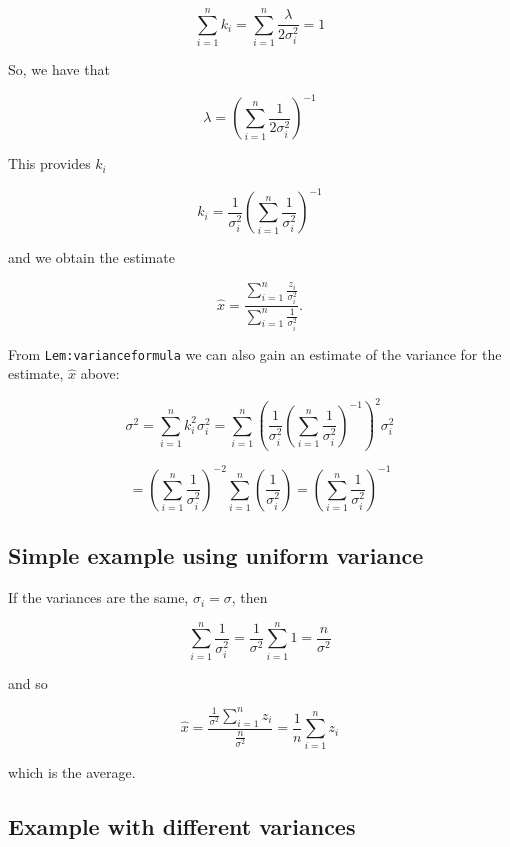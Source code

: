 \[\sum_{i=1}^n k_i =  \sum_{i=1}^n \frac{\lambda}{2\sigma_i^2} = 1\]

So, we have that

\[\lambda =  \left(\displaystyle\sum_{i=1}^n \displaystyle \frac{1}{2\sigma_i^2}\right)^{-1}\]

This provides \(k_i\)

\[k_i = \frac{1}{\sigma_i^2} \left(\displaystyle\sum_{i=1}^n \displaystyle \frac{1}{\sigma_i^2}\right)^{-1}\]

and we obtain the estimate

\[\hat{x} = \displaystyle \frac{\displaystyle \sum_{i=1}^n \frac{z_i}{\sigma_i^2}}
{\displaystyle \sum_{i=1}^n \frac{1}{\sigma_i^2}}.\]

From \texttt{Lem:varianceformula} we can also gain an estimate of the
variance for the estimate, \(\hat{x}\) above:

\[\sigma^2 =  \sum_{i=1}^n k_i^2\sigma_i^2 =  \sum_{i=1}^n\left( \frac{1}{\sigma_i^2} \left(\displaystyle\sum_{i=1}^n \displaystyle \frac{1}{\sigma_i^2}\right)^{-1}\right)^2 \sigma_i^2\]

\[=  \left(\displaystyle\sum_{i=1}^n \displaystyle \frac{1}{\sigma_i^2}\right)^{-2} \sum_{i=1}^n\left( \frac{1}{\sigma_i^2} \right) =  \left(\displaystyle\sum_{i=1}^n \displaystyle \frac{1}{\sigma_i^2}\right)^{-1}\]

\hypertarget{simple-example-using-uniform-variance}{%
\subsection{Simple example using uniform
variance}\label{simple-example-using-uniform-variance}}

If the variances are the same, \(\sigma_i = \sigma\), then

\[\sum_{i=1}^n \frac{1}{\sigma_i^2} = \frac{1}{\sigma^2} \sum_{i=1}^n 1 = \frac{n}{\sigma^2}\]

and so

\[\hat{x} = \displaystyle \frac{\displaystyle \frac{1}{\sigma^2} \sum_{i=1}^n z_i}
{\displaystyle \frac{n}{\sigma^2}} = \displaystyle \frac{1}{n} \sum_{i=1}^n z_i\]

which is the average.

\hypertarget{dataexamplediffvar}{%
\subsection{Example with different variances}\label{dataexamplediffvar}}

